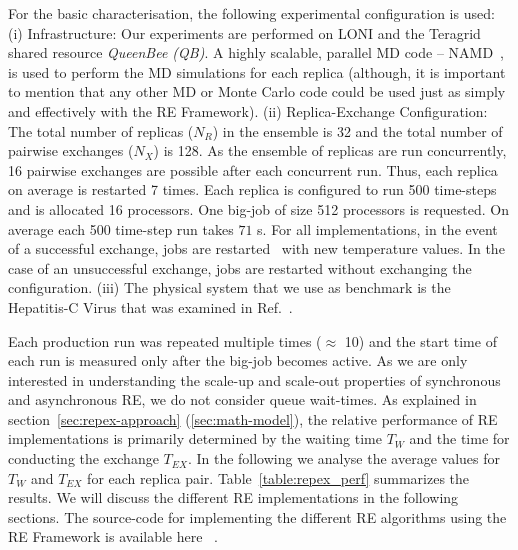 \documentclass{rspublic}
\newcommand{\jhanote}[1]{ {\textcolor{red} { ***shantenu: #1 }}}
\newcommand{\alnote}[1]{ {\textcolor{blue} { ***andre: #1 }}}
\newcommand{\athotanote}[1]{ {\textcolor{green} { ***athota: #1 }}}
\newcommand{\alnote}[1]{}
\newcommand{\athotanote}[1]{}
\newcommand{\jhanote}[1]{}
\begin{document}
For the basic characterisation, the following experimental
configuration is used: (i) Infrastructure: Our experiments are
performed on LONI and the Teragrid shared resource \emph{QueenBee (QB)}. A
highly scalable, parallel MD code -- NAMD~\citep{Phillips:2005gd}, is
used to perform the MD simulations for each replica (although, it
is important to mention that any other MD or Monte Carlo code could be
used just as simply and effectively with the RE Framework).  (ii)
Replica-Exchange Configuration: The total number of replicas ($N_R$)
in the ensemble is 32 and the total number of pairwise exchanges
($N_X$) is 128. As the ensemble of replicas are run concurrently, 16
pairwise exchanges are possible after each concurrent run. Thus, each
replica on average is restarted 7 times.  Each replica is configured
to run 500 time-steps and is allocated 16 processors. One big-job of
size 512 processors is requested. On average each 500 time-step run
takes $71$ s.  For all implementations, in the event of a
successful exchange, jobs are restarted~\citep{Luckow:2008fp} with new
temperature values.  In the case of an unsuccessful exchange, jobs are
restarted without exchanging the configuration.  (iii) The physical
system that we use as benchmark is the Hepatitis-C Virus that was
examined in Ref.~\cite{Luckow:2008fp}.



Each production run was repeated multiple times  ($\approx$ 10) %
and the start time of each run is measured only after the big-job
becomes active.  As we are only interested in understanding the
scale-up and scale-out properties of synchronous and asynchronous RE,
we do not consider queue wait-times.  As explained in
section~\ref{sec:repex-approach} (\ref{sec:math-model}), the relative
performance of RE implementations is primarily determined by the
waiting time $T_W$ and the time for conducting the exchange
$T_{EX}$. In the following we analyse the average values for $T_{W}$
and $T_{EX}$ for each replica pair.  Table~\ref{table:repex_perf}
summarizes the results. We will discuss the different RE
implementations in the following sections.  The source-code for
implementing the different RE algorithms using the RE Framework is
available here ~\citep{async-re_url}.  %
\end{document}
